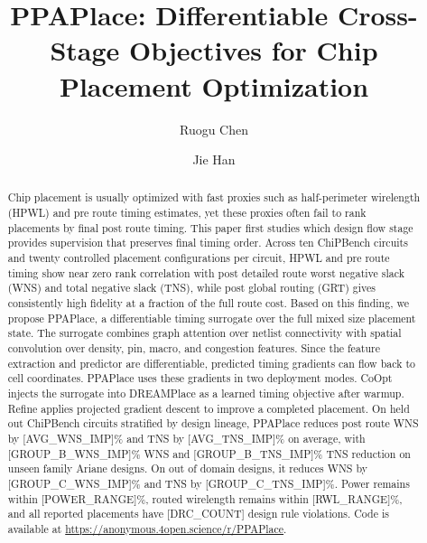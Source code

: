\documentclass[sigconf,anonymous,review,9pt]{acmart}
\begin{document}
\title{PPAPlace: Differentiable Cross-Stage Objectives for Chip Placement Optimization}

\author{Ruogu Chen}

\author{Jie Han}

\begin{abstract}
Chip placement is usually optimized with fast proxies such as
half-perimeter wirelength (HPWL) and pre route timing estimates, yet
these proxies often fail to rank placements by final post route timing.
This paper first studies which design flow stage provides supervision
that preserves final timing order. Across ten ChiPBench circuits and
twenty controlled placement configurations per circuit, HPWL and pre
route timing show near zero rank correlation with post detailed route
worst negative slack (WNS) and total negative slack (TNS), while post
global routing (GRT) gives consistently high fidelity at a fraction of
the full route cost. Based on this finding, we propose PPAPlace, a
differentiable timing surrogate over the full mixed size placement
state. The surrogate combines graph attention over netlist connectivity
with spatial convolution over density, pin, macro, and congestion
features. Since the feature extraction and predictor are differentiable,
predicted timing gradients can flow back to cell coordinates. PPAPlace
uses these gradients in two deployment modes. CoOpt injects the
surrogate into DREAMPlace as a learned timing objective after warmup.
Refine applies projected gradient descent to improve a completed
placement. On held out ChiPBench circuits stratified by design lineage,
PPAPlace reduces post route WNS by [AVG_WNS_IMP]\% and TNS by
[AVG_TNS_IMP]\% on average, with [GROUP_B_WNS_IMP]\% WNS and
[GROUP_B_TNS_IMP]\% TNS reduction on unseen family Ariane designs.
On out of domain designs, it reduces WNS by [GROUP_C_WNS_IMP]\% and
TNS by [GROUP_C_TNS_IMP]\%. Power remains within [POWER_RANGE]\%,
routed wirelength remains within [RWL_RANGE]\%, and all reported
placements have [DRC_COUNT] design rule violations. Code is available at
\url{https://anonymous.4open.science/r/PPAPlace}.
\end{abstract}
\end{document}

